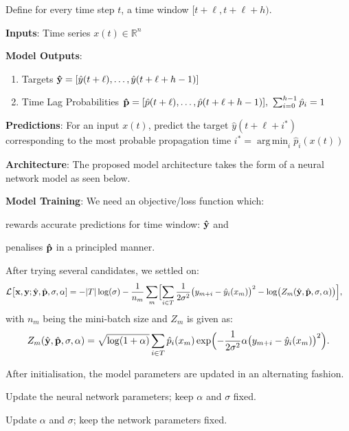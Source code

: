\documentclass[portrait,a0,final]{a0poster}
\DeclareMathOperator*{\argmin}{arg\,min}
\newcommand{\mydrawing}[3]{
  \vspace{0.5cm}
  \begin{center}
    \resizebox*{#2\hsize}{!}{}
    \label{#3}
  \end{center}
  \vspace{0.5cm}
  \stepcounter{figure}
}
\newenvironment{poster}{
  \begin{center}
  \begin{minipage}[c]{0.95\textwidth}
}{
  \end{minipage} 
  \end{center}
}
\begin{document}
\begin{poster}
\begin{multicols}{2}
Define for every time step $t$, a time window $[t+\ell, t+\ell+h)$. 
\vspace{0.4\baselineskip}

\textbf{Inputs}: Time series $x(t) \in \mathbb{R}^{n}$ \vspace{0.5\baselineskip}

\textbf{Model Outputs}: 
\begin{enumerate}
\item Targets ${\bf\hat{y}} = [\hat{y}(t+\ell), \dots, \hat{y}(t+\ell+h-1)]$
\item Time Lag Probabilities ${\bf\hat{p}} = [\hat{p}(t+\ell), \dots, \hat{p}(t+\ell+h-1)], \ \sum^{h-1}_{i = 0}{\hat{p}_{i}} = 1$
\end{enumerate}

\vspace{0.4\baselineskip}

\textbf{Predictions}: For an input $x(t)$, predict the target 
$\hat{y}(t + \ell + i^{*})$ corresponding to the most probable 
propagation time $i^{*} = \argmin_{i}{\hat{p}_i(x(t))}$

\vspace{0.4\baselineskip}

\textbf{Architecture}: The proposed model architecture takes the form of a neural network 
model as seen below.\mydrawing{archi.tex}{0.6}{fig:NN}

\textbf{Model Training}: We need an objective/loss function which:
\begin{enumerate*}
    \item rewards accurate predictions for time window: $\bf \hat{y}$ and 
    \item penalises $\bf \hat{p}$ in a principled manner.
\end{enumerate*}
%
After trying several candidates, we settled on: 
\begin{align*}\label{eq:LL}
    {\cal L}\bigl[ {\bf x, y};\hat {\bf y},\hat {\bf p},\sigma,{\bf \alpha}] &= -\vert T\vert\log(\sigma)
    -\frac{1}{n_m}\sum_m\Bigl[
    \sum_{i \in T}\frac{1}{2\sigma^2}\bigl(y_{m+i}-\hat y_i(x_m)\bigr)^2 - 
    \log\bigl(Z_m(\hat {\bf y},\hat {\bf p},\sigma,{\bf \alpha})\bigr)\Bigr],
\end{align*}
%
with $n_m$ being the mini-batch size and $Z_m$ is given as:
\[
  Z_m(\hat {\bf y},\hat {\bf p},\sigma,{\bf \alpha}) = \sqrt{\log(1+\alpha)}\sum_{i \in T}\hat p_i(x_m)\exp\Bigl(
    - \frac{1}{2\sigma^2}\alpha\bigl(y_{m+i}-\hat y_i(x_m)\bigr)^2\Bigr).
\]
%

After initialisation, the model parameters are updated in an alternating fashion.
\begin{enumerate*}
  \item Update the neural network parameters; keep $\alpha$ and $\sigma$ fixed.
  \item Update $\alpha$ and $\sigma$; keep the network parameters fixed.
\end{enumerate*}


\end{multicols}
\end{poster}
\end{document}
